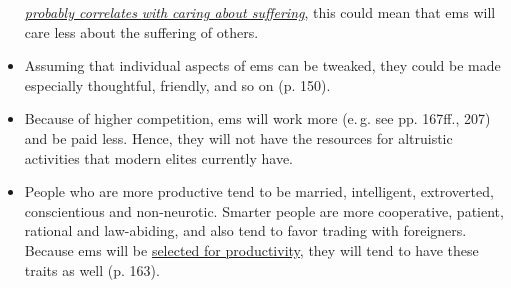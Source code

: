 \documentclass[]{article}
\begin{document}
\begin{itemize}
  \href{http://reducing-suffering.org/how-important-is-experiencing-suffering-for-caring-about-suffering/}{\emph{probably
  correlates} \emph{with caring about suffering}}, this could mean that
  ems will care less about the suffering of others.
\item
  Assuming that individual aspects of ems can be tweaked, they could be
  made especially thoughtful, friendly, and so on (p. 150).
\item
  Because of higher competition, ems will work more (e.\,g. see pp.
  167ff., 207) and be paid less. Hence, they will not have the resources
  for altruistic activities that modern elites currently have.
\item
  People who are more productive tend to be married, intelligent,
  extroverted, conscientious and non-neurotic. Smarter people are more
  cooperative, patient, rational and law-abiding, and also tend to favor
  trading with foreigners. Because ems will be
  \href{https://casparoesterheld.com/2016/08/30/the-age-of-em-summary-of-policy-relevant-information/\#WhoBecomesEm}{selected
  for productivity}, they will tend to have these traits as well (p.
  163).


\end{itemize}
\end{document}
